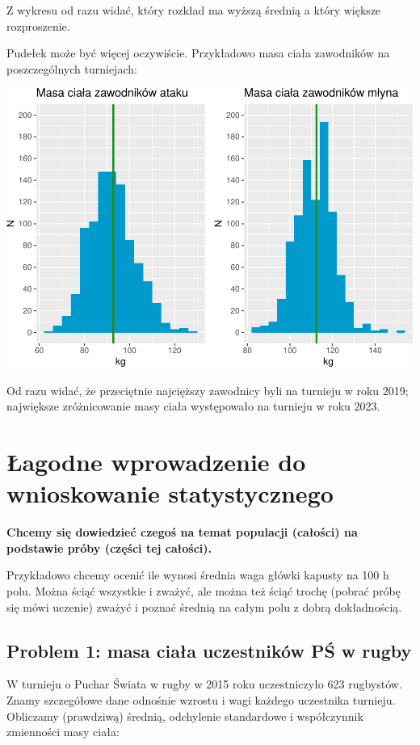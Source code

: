 \documentclass[
  openany]{book}
\begin{document}
Z wykresu od razu widać, który rozkład ma wyższą średnią a który większe rozproszenie.

Pudełek może być więcej oczywiście. Przykładowo
masa ciała zawodników na poszczególnych turniejach:

\includegraphics{_main_files/figure-latex/unnamed-chunk-19-1.pdf}

Od razu widać, że przeciętnie najcięższy zawodnicy byli na turnieju w roku 2019; największe zróżnicowanie masy
ciała występowało na turnieju w roku 2023.

\hypertarget{interference}{%
\chapter{Łagodne wprowadzenie do wnioskowanie statystycznego}\label{interference}}

\textbf{Chcemy się dowiedzieć czegoś na temat populacji (całości)
na podstawie próby (części tej całości).}

Przykładowo chcemy ocenić ile wynosi średnia waga główki kapusty
na 100 h polu. Można ściąć wszystkie i zważyć, ale można też ściąć
trochę (pobrać próbę się mówi uczenie) zważyć i poznać średnią
na całym polu z dobrą dokładnością.

\hypertarget{problem-1-masa-ciaux142a-uczestnikuxf3w-pux15b-w-rugby}{%
\section{Problem 1: masa ciała uczestników PŚ w rugby}\label{problem-1-masa-ciaux142a-uczestnikuxf3w-pux15b-w-rugby}}

W turnieju o Puchar Świata w rugby w 2015 roku uczestniczyło
623 rugbystów. Znamy szczegółowe dane odnośnie wzrostu i wagi każdego
uczestnika turnieju. Obliczamy (prawdziwą) średnią, odchylenie standardowe
i współczynnik zmienności masy ciała:
\end{document}
